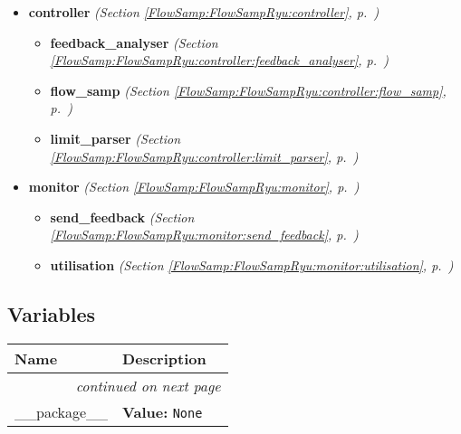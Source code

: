 \begin{itemize}
\setlength{\parskip}{0ex}
\item \textbf{controller}
  \textit{(Section \ref{FlowSamp:FlowSampRyu:controller}, p.~\pageref{FlowSamp:FlowSampRyu:controller})}

  \begin{itemize}
\setlength{\parskip}{0ex}
    \item \textbf{feedback\_analyser}
  \textit{(Section \ref{FlowSamp:FlowSampRyu:controller:feedback_analyser}, p.~\pageref{FlowSamp:FlowSampRyu:controller:feedback_analyser})}

    \item \textbf{flow\_samp}
  \textit{(Section \ref{FlowSamp:FlowSampRyu:controller:flow_samp}, p.~\pageref{FlowSamp:FlowSampRyu:controller:flow_samp})}

    \item \textbf{limit\_parser}
  \textit{(Section \ref{FlowSamp:FlowSampRyu:controller:limit_parser}, p.~\pageref{FlowSamp:FlowSampRyu:controller:limit_parser})}

  \end{itemize}
\item \textbf{monitor}
  \textit{(Section \ref{FlowSamp:FlowSampRyu:monitor}, p.~\pageref{FlowSamp:FlowSampRyu:monitor})}

  \begin{itemize}
\setlength{\parskip}{0ex}
    \item \textbf{send\_feedback}
  \textit{(Section \ref{FlowSamp:FlowSampRyu:monitor:send_feedback}, p.~\pageref{FlowSamp:FlowSampRyu:monitor:send_feedback})}

    \item \textbf{utilisation}
  \textit{(Section \ref{FlowSamp:FlowSampRyu:monitor:utilisation}, p.~\pageref{FlowSamp:FlowSampRyu:monitor:utilisation})}

  \end{itemize}
\end{itemize}



  \subsection{Variables}

    \vspace{-1cm}
\hspace{\varindent}\begin{longtable}{|p{\varnamewidth}|p{\vardescrwidth}|l}
\cline{1-2}
\cline{1-2} \centering \textbf{Name} & \centering \textbf{Description}& \\
\cline{1-2}
\endhead\cline{1-2}\multicolumn{3}{r}{\small\textit{continued on next page}}\\\endfoot\cline{1-2}
\endlastfoot\raggedright \_\-\_\-p\-a\-c\-k\-a\-g\-e\-\_\-\_\- & \raggedright \textbf{Value:} 
{\tt None}&\\
\cline{1-2}
\end{longtable}

